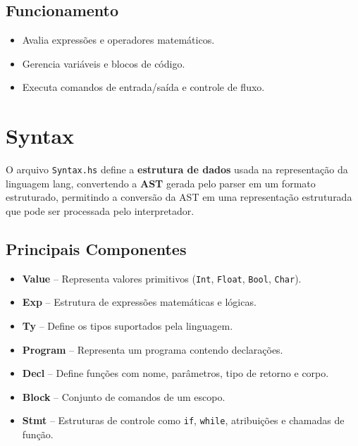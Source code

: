 \documentclass{article}
\begin{document}
\subsection{Funcionamento}
\begin{itemize}
    \item Avalia expressões e operadores matemáticos.
    \item Gerencia variáveis e blocos de código.
    \item Executa comandos de entrada/saída e controle de fluxo.
\end{itemize}

\section{Syntax}

O arquivo \texttt{Syntax.hs} define a \textbf{estrutura de dados} usada na representação da linguagem lang, convertendo a \textbf{AST} gerada pelo parser em um formato estruturado, permitindo a conversão da AST em uma representação estruturada que pode ser processada pelo interpretador.

\subsection{Principais Componentes}
\begin{itemize}
    \item \textbf{Value} – Representa valores primitivos (\texttt{Int}, \texttt{Float}, \texttt{Bool}, \texttt{Char}).
    \item \textbf{Exp} – Estrutura de expressões matemáticas e lógicas.
    \item \textbf{Ty} – Define os tipos suportados pela linguagem.
    \item \textbf{Program} – Representa um programa contendo declarações.
    \item \textbf{Decl} – Define funções com nome, parâmetros, tipo de retorno e corpo.
    \item \textbf{Block} – Conjunto de comandos de um escopo.
    \item \textbf{Stmt} – Estruturas de controle como \texttt{if}, \texttt{while}, atribuições e chamadas de função.
\end{itemize}
\end{document}
